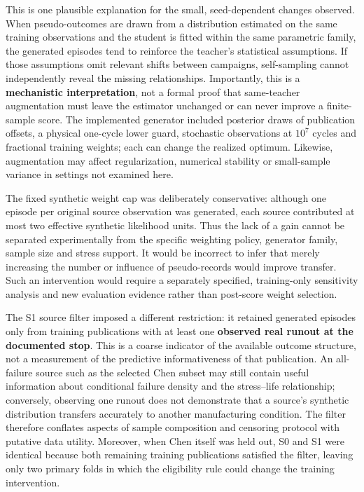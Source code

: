 \documentclass[12pt,a4paper]{article}
\begin{document}
This is one plausible explanation for the small, seed-dependent changes observed. When pseudo-outcomes are drawn from a distribution estimated on the same training observations and the student is fitted within the same parametric family, the generated episodes tend to reinforce the teacher's statistical assumptions. If those assumptions omit relevant shifts between campaigns, self-sampling cannot independently reveal the missing relationships. Importantly, this is a \textbf{mechanistic interpretation}, not a formal proof that same-teacher augmentation must leave the estimator unchanged or can never improve a finite-sample score. The implemented generator included posterior draws of publication offsets, a physical one-cycle lower guard, stochastic observations at \(10^7\) cycles and fractional training weights; each can change the realized optimum. Likewise, augmentation may affect regularization, numerical stability or small-sample variance in settings not examined here.

The fixed synthetic weight cap was deliberately conservative: although one episode per original source observation was generated, each source contributed at most two effective synthetic likelihood units. Thus the lack of a gain cannot be separated experimentally from the specific weighting policy, generator family, sample size and stress support. It would be incorrect to infer that merely increasing the number or influence of pseudo-records would improve transfer. Such an intervention would require a separately specified, training-only sensitivity analysis and new evaluation evidence rather than post-score weight selection.

The S1 source filter imposed a different restriction: it retained generated episodes only from training publications with at least one \textbf{observed real runout at the documented stop}. This is a coarse indicator of the available outcome structure, not a measurement of the predictive informativeness of that publication. An all-failure source such as the selected Chen subset may still contain useful information about conditional failure density and the stress–life relationship; conversely, observing one runout does not demonstrate that a source's synthetic distribution transfers accurately to another manufacturing condition. The filter therefore conflates aspects of sample composition and censoring protocol with putative data utility. Moreover, when Chen itself was held out, S0 and S1 were identical because both remaining training publications satisfied the filter, leaving only two primary folds in which the eligibility rule could change the training intervention.
\end{document}
